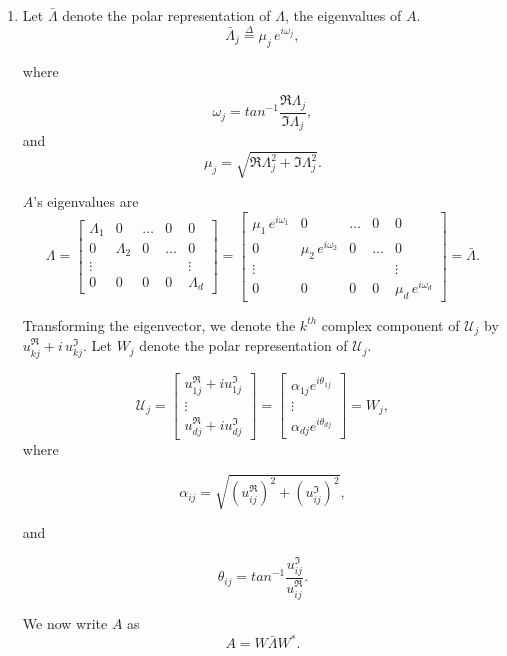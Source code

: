 \begin{enumerate}
\item Let $\bar{\Lambda}$ denote the polar representation of $\Lambda$, the eigenvalues of $A$. 
$$
\bar{\Lambda}_j
\overset{\Delta}{=}
\mu_j \, e^{i \omega_j},
$$

where 

$$
\omega_j = tan^{-1} \frac{\Re\Lambda_j}{\Im\Lambda_j}, 
$$
and
$$
\mu_j = \sqrt{\Re\Lambda_j^2 + \Im\Lambda_j^2}.
$$

$A$'s eigenvalues are
$$
\Lambda = 
\begin{bmatrix}
\Lambda_1 & 0 & \hdots &0  & 0
\\
0 & \Lambda_2 & 0 & \hdots & 0
\\
\vdots & & & & \vdots
\\
 0& 0  & 0 & 0 & \Lambda_d
 \end{bmatrix}
 = 
 \begin{bmatrix}
\mu_1 \, e^{i \omega_1} & 0 & \hdots &0  & 0
\\
0 & \mu_2 \, e^{i \omega_2} & 0 & \hdots & 0
\\
\vdots & & & & \vdots
\\
 0& 0  & 0 & 0 & \mu_d \, e^{i \omega_d}
 \end{bmatrix} = \bar{\Lambda}.
$$

Transforming the eigenvector, we denote the $k^{th}$ complex component of $\mathcal{U}_j$ by $u_{kj}^\Re + i \, u_{kj}^\Im$. Let $W_j$ denote the polar representation of $\mathcal{U}_j$.

$$
\mathcal{U}_j 
=
\begin{bmatrix}
u_{1j}^\Re + i u_{1j}^\Im
\\
\vdots
\\
u_{dj}^\Re + i u_{dj}^\Im
\end{bmatrix}
=
\begin{bmatrix}
\alpha_{1j} e^{i \theta_{1j}}
\\
\vdots
\\
\alpha_{dj} e^{i \theta_{dj}}
\end{bmatrix} = W_j,
$$
where

$$
\alpha_{ij} = \sqrt{(u_{ij}^\Re)^2 + (u_{ij}^\Im)^2},
$$

and

$$
\theta_{ij} = tan^{-1} \frac{u_{ij}^\Im}{u_{ij}^\Re}.
$$


We now write $A$ as 
$$
A = 
W \bar{\Lambda} W^*.
$$


\end{enumerate}
